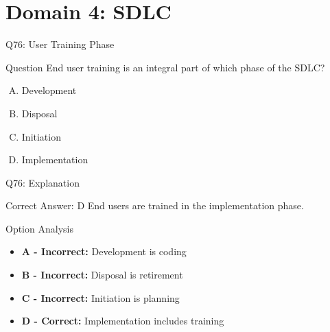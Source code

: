 \documentclass{beamer}
\begin{document}
	\section{Domain 4: SDLC}
	

	
	\begin{frame}{Q76: User Training Phase}
		\begin{block}{Question}
			End user training is an integral part of which phase of the SDLC?
		\end{block}
		\begin{enumerate}[(A)]
			\item Development
			\item Disposal
			\item Initiation
			\item Implementation
		\end{enumerate}
	\end{frame}
	
	\begin{frame}{Q76: Explanation}
		\begin{block}{Correct Answer: D}
			End users are trained in the implementation phase.
		\end{block}
		\begin{block}{Option Analysis}
			\begin{itemize}
				\item \textbf{A - Incorrect:} Development is coding
				\item \textbf{B - Incorrect:} Disposal is retirement
				\item \textbf{C - Incorrect:} Initiation is planning
				\item \textbf{D - Correct:} Implementation includes training
			\end{itemize}
		\end{block}
	\end{frame}
	
\end{document}

